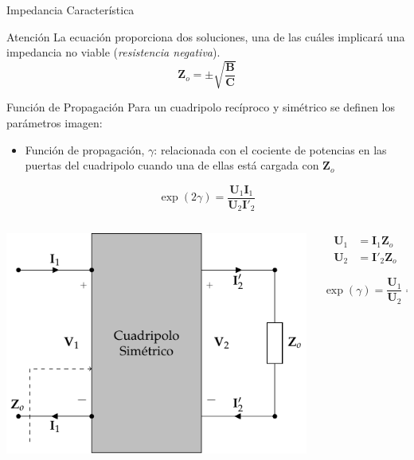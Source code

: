 \documentclass[aspectratio=169, usenames,svgnames,dvipsnames]{beamer}
\begin{document}
\begin{frame}[label={sec:org9b89bd7}]{Impedancia Característica}
\begin{block}{Atención}
La ecuación proporciona dos soluciones, una de las cuáles implicará una impedancia no viable (\emph{resistencia negativa}).
\[
\boxed{\mathbf{Z}_o = \pm \sqrt{\frac{\mathbf{B}}{\mathbf{C}}}}
\]
\end{block}
\end{frame}

\begin{frame}[label={sec:org5cac2d9}]{Función de Propagación}
Para un cuadripolo \alert{recíproco} y \alert{simétrico} se definen los parámetros imagen:

\begin{itemize}
\item \alert{Función de propagación}, \(\gamma\): relacionada con el cociente de potencias en las puertas del cuadripolo cuando una de ellas está cargada con \(\mathbf{Z}_o\)
\end{itemize}

\[
  \exp(2\gamma) = \frac{\mathbf{U}_1\mathbf{I}_1}{\mathbf{U}_2\mathbf{I}'_2}
\]

\begin{columns}
\begin{column}{0.5\columnwidth}
\begin{center}
\includegraphics[height=0.5\textheight]{../figs/cuadripolo_impedancia_caracteristica.pdf}
\end{center}
\end{column}

\begin{column}{0.5\columnwidth}
\begin{align*}
  \mathbf{U}_1 &= \mathbf{I}_1 \mathbf{Z}_o\\
  \mathbf{U}_2 &= \mathbf{I}'_2 \mathbf{Z}_o
\end{align*}

\[
  \boxed{\exp(\gamma) = \frac{\mathbf{U}_1}{\mathbf{U}_2} = \frac{\mathbf{I}_1}{\mathbf{I}'_2}}
\]
\end{column}
\end{columns}
\end{frame}
\end{document}

